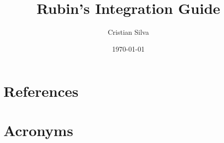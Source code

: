 \documentclass[PMO,authoryear,lsstdraft,toc]{lsstdoc}
\title{Rubin's Integration Guide}
\author{%
Cristian Silva
}
\date{\today}
\begin{document}
\maketitle





\appendix
\section{References} \label{sec:bib}
\renewcommand{\refname}{} %


\section{Acronyms} \label{sec:acronyms}

\end{document}
